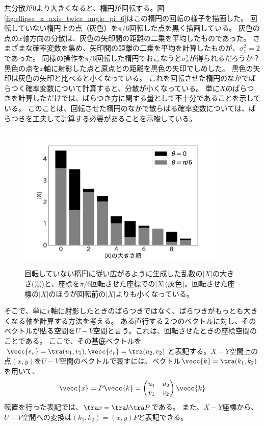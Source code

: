 共分散が$0$より大きくなると、楕円が回転する。図\ref{fig:ellipse_x_axis_twice_angle_pi_6}はこの楕円の回転の様子を描画した。
回転していない楕円上の点（灰色）を$\pi/6$回転した点を黒く描画している。
灰色の点の$x$軸方向の分散は、灰色の矢印間の距離の二乗を平均したものであった。
さまざまな確率変数を集め、矢印間の距離の二乗を平均を計算したものが、$\sigma_x^2=2$であった。
同様の操作を$\pi/6$回転した楕円でおこなうと$\sigma_x^2$が得られるだろうか？
黒色の点を$x$軸に射影した点と原点との距離を黒色の矢印でしめした。
黒色の矢印は灰色の矢印と比べると小くなっている。
これを回転させた楕円のなかでばらつく確率変数について計算すると、分散が小くなっている。
単に$X$のばらつきを計算しただけでは、ばらつき方に関する量として不十分であることを示している。
このことは、回転させた楕円のなかで散らばる確率変数については、ばらつきを工夫して計算する必要があることを示唆している。

\begin{figure}
 \begin{center}
  \includegraphics[width=10cm]{./image/16_/ellipse_distributed_X_comparison.pdf}
  \label{fig:ellipse_distributed_X_comparison}
  \caption{回転していない楕円に従い広がるように生成した乱数の$|X|$の大きさ(黒)と、座標を$\pi/6$回転させた座標での$|X|$(灰色)。回転させた座標の$|X|$のほうが回転前の$|X|$よりも小くなっている。}
 \end{center}
\end{figure}


そこで、単に$x$軸に射影したときのばらつきではなく、ばらつきがもっとも大きくなる軸を計算する方法を考える。
ある直行する２つのベクトルに対し、そのベクトルが貼る空間を$U-V$空間と言う。これは、回転させたときの座標空間のことである。
ここで、その基底ベクトルを$\vecc{e_u}=\tra (u_1,v_1),\vecc{e_v}=\tra (u_2,v_2)$と表記する。$X-Y$空間上の点$(x,y)$を$U-V$空間のベクトルで表すには、ベクトル$\vecc{k}=\tra(k_1,k_2)$を用いて、
\begin{equation*}
 \vecc{x} = P\vecc{k} = \begin{pmatrix}
u_1 & u_2 \\
v_1 & v_2 \\
\end{pmatrix}\vecc{k}
\end{equation*}
転置を行った表記では、$\tra x = \tra k \tra P$である。
また、$X-Y$座標から、$U-V$空間への変換は$(k_1,k_2)=(x,y)P$と表記できる。

